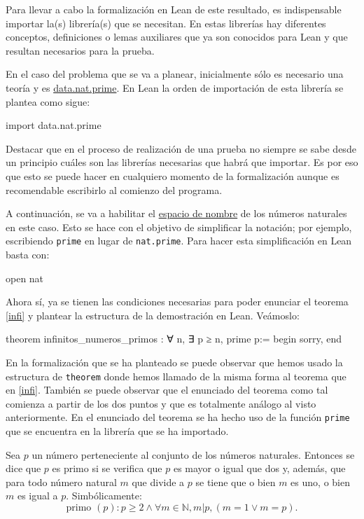 Para llevar a cabo la formalización en Lean de este resultado,
es indispensable importar la(s) librería(s) que se necesitan. En estas librerías
hay diferentes conceptos, definiciones o lemas auxiliares que ya son conocidos
para Lean y que resultan necesarios para la prueba.

En el caso del problema que se va a planear, inicialmente sólo es necesario
una teoría y es
\href{https://github.com/leanprover-community/mathlib/blob/master/src/data/nat/prime.lean}
{data.nat.prime}. En Lean la orden de importación de esta librería se plantea
como sigue:
\begin{leancode}
import data.nat.prime
\end{leancode}
\begin{nota}
  Destacar que en el proceso de realización de una prueba no siempre se sabe
  desde un principio cuáles son las librerías necesarias que habrá que importar.
  Es por eso que esto se puede hacer en cualquiero momento de la formalización
  aunque es recomendable escribirlo al comienzo del programa.
\end{nota}

A continuación, se va a habilitar el \href{https://leanprover.github.io/reference/other_commands.html#namespaces}
{espacio de nombre} de los números naturales en este caso. Esto se hace con el
objetivo de simplificar la notación; por ejemplo, escribiendo \texttt{prime}
en lugar de \texttt{nat.prime}. Para hacer esta simplificación en Lean basta
con:
\begin{leancode}
open nat
\end{leancode}

Ahora sí, ya se tienen las condiciones necesarias para poder enunciar el
teorema \ref{infi} y plantear la estructura de la demostración en Lean.
Veámoslo:
\begin{leancode}
theorem infinitos_numeros_primos : ∀ n, ∃ p ≥ n, prime p:=
begin
  sorry,
end
\end{leancode}

En la formalización que se ha planteado se puede observar que hemos usado la
estructura de \texttt{theorem} donde hemos llamado de la misma forma al
teorema que en \ref{infi}. También se puede observar que el enunciado del
teorema como tal comienza a partir de los dos puntos y que es totalmente
análogo al visto anteriormente. En el enunciado del teorema se ha hecho uso
de la función \texttt{prime} que se encuentra en la librería que se ha
importado.

\begin{definicion}
  Sea \(p\) un número perteneciente al conjunto de los números naturales.
  Entonces se dice que \(p\) es primo si se verifica que \(p\) es mayor o
  igual que dos y, además, que para todo número natural \(m\) que divide
  a \(p\) se tiene que o bien \(m\) es uno, o bien \(m\) es igual a \(p\).
  Simbólicamente:
  \begin{equation*}
    \text{primo }(p): p≥2 ∧ ∀m∈ℕ, m|p, (m=1 \lor m=p).
  \end{equation*}
\end{definicion}

